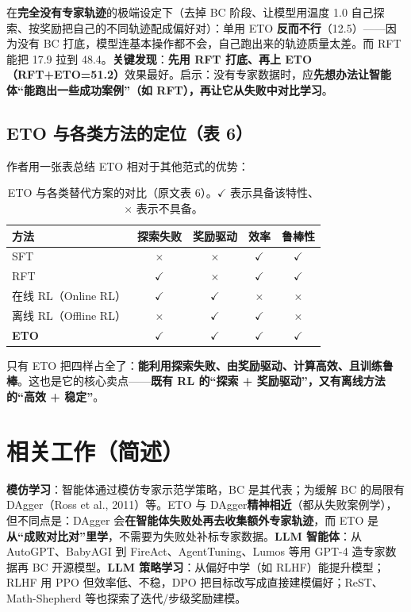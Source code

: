 \documentclass[11pt,UTF8,fontset=fandol]{ctexart}
\begin{document}
在\textbf{完全没有专家轨迹}的极端设定下（去掉 BC 阶段、让模型用温度 1.0 自己探索、按奖励把自己的不同轨迹配成偏好对）：单用 ETO \textbf{反而不行}（12.5）——因为没有 BC 打底，模型连基本操作都不会，自己跑出来的轨迹质量太差。而 RFT 能把 17.9 拉到 48.4。\textbf{关键发现}：\textbf{先用 RFT 打底、再上 ETO（RFT+ETO=51.2）}效果最好。启示：没有专家数据时，应\textbf{先想办法让智能体“能跑出一些成功案例”（如 RFT），再让它从失败中对比学习}。

\subsection{ETO 与各类方法的定位（表 6）}

作者用一张表总结 ETO 相对于其他范式的优势：

\begin{table}[H]\centering
\caption{ETO 与各类替代方案的对比（原文表 6）。$\checkmark$ 表示具备该特性、$\times$ 表示不具备。}
\label{tab:vs}
\begin{tabular}{lcccc}
\toprule
方法 & 探索失败 & 奖励驱动 & 效率 & 鲁棒性 \\
\midrule
SFT          & $\times$    & $\times$    & $\checkmark$ & $\checkmark$ \\
RFT          & $\checkmark$ & $\times$    & $\checkmark$ & $\checkmark$ \\
在线 RL（Online RL） & $\checkmark$ & $\checkmark$ & $\times$    & $\times$ \\
离线 RL（Offline RL）& $\times$    & $\checkmark$ & $\checkmark$ & $\times$ \\
\textbf{ETO} & $\checkmark$ & $\checkmark$ & $\checkmark$ & $\checkmark$ \\
\bottomrule
\end{tabular}
\end{table}

只有 ETO 把四样占全了：\textbf{能利用探索失败、由奖励驱动、计算高效、且训练鲁棒}。这也是它的核心卖点——\textbf{既有 RL 的“探索 + 奖励驱动”，又有离线方法的“高效 + 稳定”}。

\section{相关工作（简述）}

\textbf{模仿学习}：智能体通过模仿专家示范学策略，BC 是其代表；为缓解 BC 的局限有 DAgger（Ross et al., 2011）等。ETO 与 DAgger\textbf{精神相近}（都从失败案例学），但不同点是：DAgger 会\textbf{在智能体失败处再去收集额外专家轨迹}，而 ETO 是\textbf{从“成败对比对”里学}，不需要为失败处补标专家数据。\textbf{LLM 智能体}：从 AutoGPT、BabyAGI 到 FireAct、AgentTuning、Lumos 等用 GPT-4 造专家数据再 BC 开源模型。\textbf{LLM 策略学习}：从偏好中学（如 RLHF）能提升模型；RLHF 用 PPO 但效率低、不稳，DPO 把目标改写成直接建模偏好；ReST、Math-Shepherd 等也探索了迭代/步级奖励建模。
\end{document}
